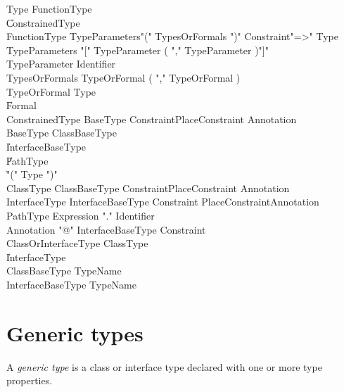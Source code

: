 \begin{grammar}
Type \: FunctionType \\
    \| ConstrainedType  \\

FunctionType \: TypeParameters\opt \xcd"(" TypesOrFormals\opt
\xcd")" Constraint\opt \xcd"=>" Type  \\
TypeParameters \: \xcd"[" TypeParameter ( \xcd"," TypeParameter )\star \xcd"]" \\
TypeParameter \: Identifier \\
TypesOrFormals \: TypeOrFormal ( \xcd"," TypeOrFormal )\star \\
TypeOrFormal   \: Type \\
               \| Formal \\

ConstrainedType \: BaseType Constraint\opt PlaceConstraint\opt
Annotation\star \\

BaseType \: ClassBaseType \\
     \| InterfaceBaseType \\
     \| PathType \\
     \| \xcd"(" Type \xcd")" \\

ClassType \: ClassBaseType Constraint\opt PlaceConstraint\opt
Annotation\star \\
InterfaceType \: InterfaceBaseType Constraint\opt
PlaceConstraint\opt Annotation\star \\

PathType \: Expression \xcd"." Identifier \\

Annotation \: \xcd"@" InterfaceBaseType Constraint\opt \\

ClassOrInterfaceType \: ClassType \\ \| InterfaceType \\
ClassBaseType \: TypeName \\
InterfaceBaseType \: TypeName \\
\end{grammar}

\section{Generic types}
\label{Generics}

A {\em generic type} is a class or interface type declared with
one or more type properties.

